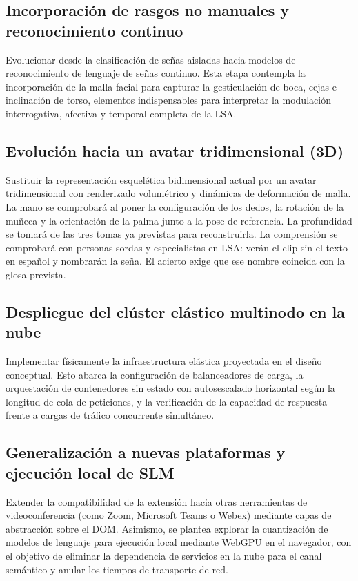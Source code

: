 \subsection{Incorporación de rasgos no manuales y reconocimiento continuo}
Evolucionar desde la clasificación de señas aisladas hacia modelos de reconocimiento de lenguaje de señas continuo. Esta etapa contempla la incorporación de la malla facial para capturar la gesticulación de boca, cejas e inclinación de torso, elementos indispensables para interpretar la modulación interrogativa, afectiva y temporal completa de la LSA.

\subsection{Evolución hacia un avatar tridimensional (3D)}
Sustituir la representación esquelética bidimensional actual por un avatar tridimensional con renderizado volumétrico y dinámicas de deformación de malla. La mano se comprobará al poner la configuración de los dedos, la rotación de la muñeca y la orientación de la palma junto a la pose de referencia. La profundidad se tomará de las tres tomas ya previstas para reconstruirla. La comprensión se comprobará con personas sordas y especialistas en LSA: verán el clip sin el texto en español y nombrarán la seña. El acierto exige que ese nombre coincida con la glosa prevista.

\subsection{Despliegue del clúster elástico multinodo en la nube}
Implementar físicamente la infraestructura elástica proyectada en el diseño conceptual. Esto abarca la configuración de balanceadores de carga, la orquestación de contenedores sin estado con autosescalado horizontal según la longitud de cola de peticiones, y la verificación de la capacidad de respuesta frente a cargas de tráfico concurrente simultáneo.

\subsection{Generalización a nuevas plataformas y ejecución local de SLM}
Extender la compatibilidad de la extensión hacia otras herramientas de videoconferencia (como Zoom, Microsoft Teams o Webex) mediante capas de abstracción sobre el DOM. Asimismo, se plantea explorar la cuantización de modelos de lenguaje para ejecución local mediante WebGPU en el navegador, con el objetivo de eliminar la dependencia de servicios en la nube para el canal semántico y anular los tiempos de transporte de red.